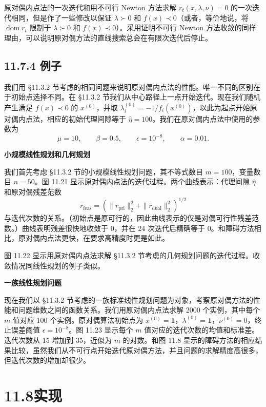 \documentclass[UTF8,12pt,a4paper,fontset=fandol]{ctexart}
\begin{document}
原对偶内点法的一次迭代和用不可行 Newton 方法求解 $r_t(x,\lambda,\nu)=0$ 的一次迭代相同，但是作了一些修改以保证 $\lambda\succ0$ 和 $f(x)\prec0$（或者，等价地说，将 $\operatorname{dom}r_t$ 限制于 $\lambda\succ0$ 和 $f(x)\prec0$）。采用证明不可行 Newton 方法收敛的同样理由，可以说明原对偶方法的直线搜索总会在有限次迭代后停止。

\subsection*{11.7.4 例子}

我们用 \S 11.3.2 节考虑的相同问题来说明原对偶内点法的性能。唯一不同的区别在于初始点选择不同。在 \S 11.3.2 节我们从中心路径上一点开始迭代。现在我们随机产生满足 $f(x)\prec0$ 的 $x^{(0)}$，并取 $\lambda_i^{(0)}=-1/f_i(x^{(0)})$，以此为起点开始原对偶内点法，相应的初始代理间隙等于 $\hat{\eta}=100$。我们在原对偶内点法中使用的参数为
\[
\mu=10,\qquad \beta=0.5,\qquad \epsilon=10^{-8},\qquad \alpha=0.01.
\]

\noindent\textbf{小规模线性规划和几何规划}

我们首先考虑 \S 11.3.2 节的小规模线性规划问题，其不等式数目 $m=100$，变量数目 $n=50$。图 11.21 显示原对偶内点法的迭代过程。两个曲线表示：代理间隙 $\hat{\eta}$ 和原对偶残差范数
\[
r_{\mathrm{feas}}=\left(\|r_{\mathrm{pri}}\|_2^2+\|r_{\mathrm{dual}}\|_2^2\right)^{1/2}
\]
与迭代次数的关系。（初始点是原可行的，因此曲线表示的仅是对偶可行性残差范数。）曲线表明残差很快地收敛于 0，并在 24 次迭代后精确等于 0。和障碍方法相比，原对偶内点法更快，在要求高精度时更是如此。

图 11.22 显示用原对偶内点法求解 \S 11.3.2 节考虑的几何规划问题的迭代过程。收敛情况同线性规划的例子类似。

\noindent\textbf{一族线性规划问题}

现在我们以 \S 11.3.2 节考虑的一族标准线性规划问题为对象，考察原对偶方法的性能和问题维数之间的函数关系。我们用原对偶内点法求解 2000 个实例，其中每个 $m$
值对应 100 个实例。原对偶算法初始点为 $x^{(0)}=\mathbf{1}$，$\lambda^{(0)}=\mathbf{1}$，$\nu^{(0)}=0$，终止误差阈值 $\epsilon=10^{-8}$。图 11.23 显示每个 $m$ 值对应的迭代次数的均值和标准差。迭代次数从 15 增加到 35，近似为 $m$ 的对数。和图 11.8 显示的障碍方法的相应结果比较，虽然我们从不可行点开始迭代原对偶方法，并且问题的求解精度高很多，但迭代次数的增加却很少。

\section*{11.8\quad 实现}
\end{document}
